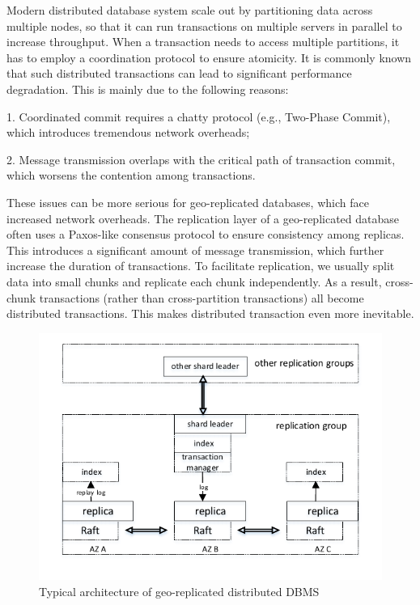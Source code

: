 \documentclass[conference]{IEEEtran}
\begin{document}
Modern distributed database system scale out by partitioning data across multiple nodes, so that it can run transactions on multiple servers in parallel to increase throughput.
When a transaction needs to access multiple partitions, it has to employ a coordination protocol to ensure atomicity.
It is commonly known that such distributed transactions can lead to significant performance degradation.
This is mainly due to the following reasons\cite{Calvin:conf/sigmod/ThomsonDWRSA12}:

1. Coordinated commit requires a chatty protocol (e.g., Two-Phase Commit), which introduces tremendous network overheads;

2. Message transmission overlaps with the critical path of transaction commit, which worsens the contention among transactions.

These issues can be more serious for geo-replicated databases, which face increased network overheads.
The replication layer of a geo-replicated database often uses a Paxos-like consensus protocol to ensure consistency among replicas.
This introduces a significant amount of message transmission, which further increase the duration of transactions.
To facilitate replication, we usually split data into small chunks and replicate each chunk independently.
As a result, cross-chunk transactions (rather than cross-partition transactions) all become distributed transactions.
This makes distributed transaction even more inevitable.

\begin{figure}[htbp]
  \centerline{\includegraphics[scale=0.8]{figure/architecture.pdf}}
  \caption{Typical architecture of geo-replicated distributed DBMS}
  \label{fig:architecture}
\end{figure}
\end{document}
